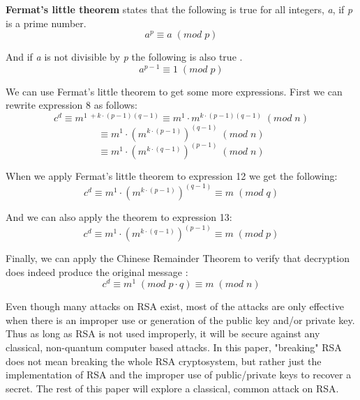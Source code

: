 \documentclass[11pt]{article}
\begin{document}
\textbf{Fermat's little theorem} states that the following is true for all integers, \emph{a}, if \emph{p} is a prime number.
\begin{equation} a^{p} \equiv a \; (mod \; p)\end{equation}

And if \emph{a} is not divisible by \emph{p} the following is also true \cite{rosen}.
\begin{equation} a^{p - 1} \equiv 1 \; (mod \; p)\end{equation}

We can use Fermat's little theorem to get some more expressions. First we can rewrite expression 8 as follows:
\begin{equation}  c^d   \equiv m^{1 \; + k \cdot (p - 1)(q - 1)} \equiv m^{1} \cdot m^{k \cdot (p - 1)(q - 1)}\; (mod \; n) \end{equation}
\begin{equation}  \equiv m^{1} \cdot (m^{k \cdot (p - 1)})^{(q - 1)}\; (mod \; n) \end{equation}
\begin{equation}  \equiv m^{1} \cdot (m^{k \cdot (q - 1)})^{(p - 1)}\; (mod \; n) \end{equation}

When we apply Fermat's little theorem to expression 12 we get the following:
\begin{equation} c^d \equiv m^{1} \cdot (m^{k \cdot (p - 1)})^{(q - 1)} \equiv m \; (mod \; q) \end{equation}

And we can also apply the theorem to expression 13:
\begin{equation} c^d \equiv m^{1} \cdot (m^{k \cdot (q - 1)})^{(p - 1)} \equiv m \; (mod \; p) \end{equation}

Finally, we can apply the Chinese Remainder Theorem to verify that decryption does indeed produce the original message \cite{rosen}:
\begin{equation} c^d \equiv m^{1} \; (mod \; p \cdot q)\equiv m \; (mod \; n) \end{equation}

Even though many attacks on RSA exist, most of the attacks are only effective when there is an improper use or generation of the public key and/or private key. Thus as long as RSA is not used improperly, it will be secure against any classical, non-quantum computer based attacks. In this paper, "breaking" RSA does not mean breaking the whole RSA cryptosystem, but rather just the implementation of RSA and the improper use of public/private keys to recover a secret. The rest of this paper will explore a classical, common attack on RSA.
\end{document}
